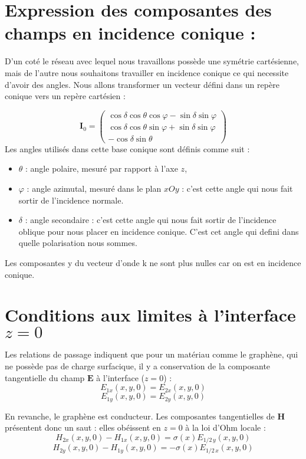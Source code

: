 \documentclass{article}
\begin{document}
\section*{Expression des composantes des champs en incidence conique :}

D'un coté le réseau avec lequel nous travaillons possède une symétrie cartésienne, mais de l'autre nous souhaitons travailler en incidence conique ce qui necessite d'avoir des angles. Nous allons transformer un vecteur défini dans un repère conique vers un repère cartésien :

\[
\mathbf{I}_0 = 
\begin{pmatrix}
\cos\delta \cos\theta \cos\varphi - \sin\delta \sin\varphi \\
\cos\delta \cos\theta \sin\varphi + \sin\delta \sin\varphi \\
-\cos\delta \sin\theta
\end{pmatrix}
\]
\noindent
Les angles utilisés dans cette base conique sont définis comme suit :
\begin{itemize}
  \item \( \theta \) : angle polaire, mesuré par rapport à l’axe \( z \),
  \item \( \varphi \) : angle azimutal, mesuré dans le plan \( xOy \) : c'est cette angle qui nous fait sortir de l'incidence normale.
  \item \( \delta \) : angle secondaire : c'est cette angle qui nous fait sortir de l'incidence oblique pour nous placer en incidence conique. C'est cet angle qui defini dans quelle polarisation nous sommes.
\end{itemize}

Les composantes y du vecteur d'onde k ne sont plus nulles car on est en incidence conique.


\section*{Conditions aux limites à l'interface $z = 0$}

Les relations de passage indiquent que pour un matériau comme le graphène, qui ne possède pas de charge surfacique, il y a conservation de la composante tangentielle du champ $\mathbf{E}$ à l'interface ($z = 0$) :
\[
E_{1x}(x, y, 0) = E_{2x}(x, y, 0)
\]
\[
E_{1y}(x, y, 0) = E_{2y}(x, y, 0)
\]

En revanche, le graphène est conducteur. Les composantes tangentielles de $\mathbf{H}$ présentent donc un saut : elles obéissent en $z = 0$ à la loi d'Ohm locale :
\[
H_{2x}(x, y, 0) - H_{1x}(x, y, 0) = \sigma(x) E_{1/2\, y}(x, y, 0)
\]
\[
H_{2y}(x, y, 0) - H_{1y}(x, y, 0) = -\sigma(x)  E_{1/2\, x}(x, y, 0)
\]
\end{document}
